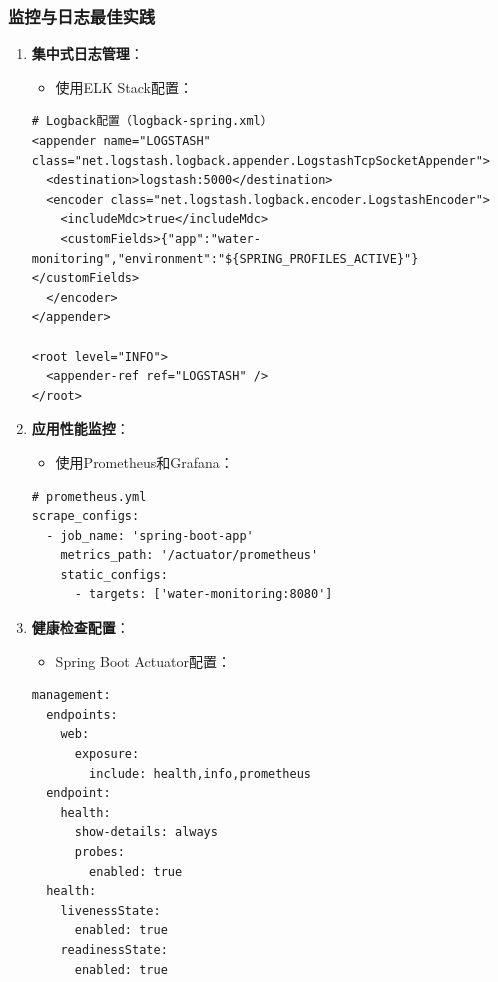 \subsubsection{监控与日志最佳实践}\label{ux76d1ux63a7ux4e0eux65e5ux5fd7ux6700ux4f73ux5b9eux8df5}

\begin{enumerate}
\def\labelenumi{\arabic{enumi}.}
\tightlist
\item
  \textbf{集中式日志管理}：

  \begin{itemize}
  \tightlist
  \item
    使用ELK Stack配置：
  \end{itemize}

\begin{lstlisting}
# Logback配置（logback-spring.xml）
<appender name="LOGSTASH" class="net.logstash.logback.appender.LogstashTcpSocketAppender">
  <destination>logstash:5000</destination>
  <encoder class="net.logstash.logback.encoder.LogstashEncoder">
    <includeMdc>true</includeMdc>
    <customFields>{"app":"water-monitoring","environment":"${SPRING_PROFILES_ACTIVE}"}</customFields>
  </encoder>
</appender>

<root level="INFO">
  <appender-ref ref="LOGSTASH" />
</root>
\end{lstlisting}
\item
  \textbf{应用性能监控}：

  \begin{itemize}
  \tightlist
  \item
    使用Prometheus和Grafana：
  \end{itemize}

\begin{lstlisting}
# prometheus.yml
scrape_configs:
  - job_name: 'spring-boot-app'
    metrics_path: '/actuator/prometheus'
    static_configs:
      - targets: ['water-monitoring:8080']
\end{lstlisting}
\item
  \textbf{健康检查配置}：

  \begin{itemize}
  \tightlist
  \item
    Spring Boot Actuator配置：
  \end{itemize}

\begin{lstlisting}
management:
  endpoints:
    web:
      exposure:
        include: health,info,prometheus
  endpoint:
    health:
      show-details: always
      probes:
        enabled: true
  health:
    livenessState:
      enabled: true
    readinessState:
      enabled: true
\end{lstlisting}
\end{enumerate}

